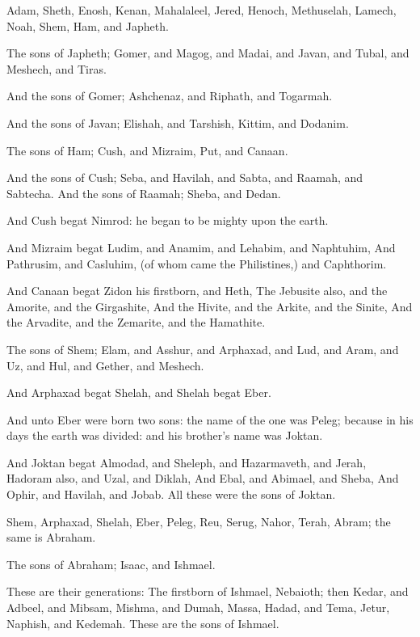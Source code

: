 \Chapter
\Verse Adam, Sheth, Enosh, \Verse Kenan, Mahalaleel, Jered, \Verse Henoch, Methuselah, Lamech, \Verse Noah, Shem, Ham, and Japheth.

\Verse The sons of Japheth; Gomer, and Magog, and Madai, and Javan, and Tubal, and Meshech, and Tiras.

\Verse And the sons of Gomer; Ashchenaz, and Riphath, and Togarmah.

\Verse And the sons of Javan; Elishah, and Tarshish, Kittim, and Dodanim.

\Verse The sons of Ham; Cush, and Mizraim, Put, and Canaan.

\Verse And the sons of Cush; Seba, and Havilah, and Sabta, and Raamah, and Sabtecha. And the sons of Raamah; Sheba, and Dedan.

\Verse And Cush begat Nimrod: he began to be mighty upon the earth.

\Verse And Mizraim begat Ludim, and Anamim, and Lehabim, and Naphtuhim, \Verse And Pathrusim, and Casluhim, (of whom came the Philistines,) and Caphthorim.

\Verse And Canaan begat Zidon his firstborn, and Heth, \Verse The Jebusite also, and the Amorite, and the Girgashite, \Verse And the Hivite, and the Arkite, and the Sinite, \Verse And the Arvadite, and the Zemarite, and the Hamathite.

\Verse The sons of Shem; Elam, and Asshur, and Arphaxad, and Lud, and Aram, and Uz, and Hul, and Gether, and Meshech.

\Verse And Arphaxad begat Shelah, and Shelah begat Eber.

\Verse And unto Eber were born two sons: the name of the one was Peleg; because in his days the earth was divided: and his brother's name was Joktan.

\Verse And Joktan begat Almodad, and Sheleph, and Hazarmaveth, and Jerah, \Verse Hadoram also, and Uzal, and Diklah, \Verse And Ebal, and Abimael, and Sheba, \Verse And Ophir, and Havilah, and Jobab. All these were the sons of Joktan.

\Verse Shem, Arphaxad, Shelah, \Verse Eber, Peleg, Reu, \Verse Serug, Nahor, Terah, \Verse Abram; the same is Abraham.

\Verse The sons of Abraham; Isaac, and Ishmael.

\Verse These are their generations: The firstborn of Ishmael, Nebaioth; then Kedar, and Adbeel, and Mibsam, \Verse Mishma, and Dumah, Massa, Hadad, and Tema, \Verse Jetur, Naphish, and Kedemah. These are the sons of Ishmael.

